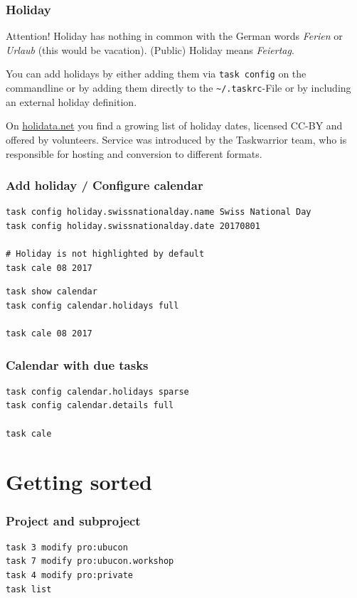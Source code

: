 \documentclass[t,handout]{beamer}
\begin{document}
\begin{frame}[fragile]\frametitle{Holiday}
    \begin{alertblock}{Attention!}
        Holiday has nothing in common with the German words \textit{Ferien} or \textit{Urlaub} (this would be vacation). (Public) Holiday means \textit{Feiertag}.
    \end{alertblock}

    You can add holidays by either adding them via \verb=task config= on the commandline or by adding them directly to the \verb=~/.taskrc=-File or by including an external holiday definition.

    On \href{http://holidata.net/}{holidata.net} you find a growing list of holiday dates, licensed CC-BY and offered by volunteers. Service was introduced by the Taskwarrior team, who is responsible for hosting and conversion to different formats.
\end{frame}

\begin{frame}[fragile]\frametitle{Add holiday / Configure calendar}
    \vfill
    \begin{lstlisting}
task config holiday.swissnationalday.name Swiss National Day
task config holiday.swissnationalday.date 20170801

# Holiday is not highlighted by default
task cale 08 2017\end{lstlisting}

    \begin{lstlisting}
task show calendar
task config calendar.holidays full

task cale 08 2017\end{lstlisting}
\end{frame}


\begin{frame}[fragile]\frametitle{Calendar with due tasks}
    \vfill
    \begin{lstlisting}
task config calendar.holidays sparse
task config calendar.details full

task cale\end{lstlisting}
\end{frame}

\section{Getting sorted}

\begin{frame}[fragile]\frametitle{Project and subproject}
    \vfill
    \begin{lstlisting}
task 3 modify pro:ubucon
task 7 modify pro:ubucon.workshop
task 4 modify pro:private
task list
\end{lstlisting}
\end{frame}
\end{document}
